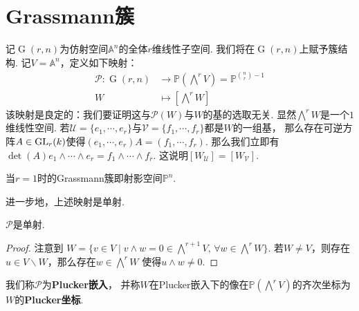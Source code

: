 \section{Grassmann簇}
    记$\operatorname{G}(r,n)$为仿射空间$\mathbb{A}^{n}$的全体$r$维线性子空间. 
    我们将在$\operatorname{G}(r,n)$上赋予簇结构. 
    记$V = \mathbb{A}^{n}$，定义如下映射：
    \begin{equation*}\begin{aligned}
      \mathcal{P}\colon\operatorname{G}(r,n) 
      &\longrightarrow \mathbb{P}(\bigwedge\nolimits^{r}V)=\mathbb{P}^{{n \choose r}-1} \\
      W &\longmapsto [\bigwedge\nolimits^{r}W]
    \end{aligned}\end{equation*}
    该映射是良定的：我们要证明这与$\mathcal{P}(W)$与$W$的基的选取无关. 
    显然$\bigwedge\nolimits^{r}W$是一个$1$维线性空间.
    若$\mathcal{U}=\{e_{1},\cdots,e_{r}\}$与$\mathcal{V}=\{f_{1},\cdots,f_{r}\}$都是$W$的一组基，
    那么存在可逆方阵$A \in {\rm GL}_{r}(k)$使得$(e_{1},\cdots,e_{r})A=(f_{1},\cdots,f_{r})$.
    那么我们立即有
    $\det(A)e_{1}\wedge\cdots\wedge e_{r}=f_{1}\wedge\cdots\wedge f_{r}$. 
    这说明$[W_{\mathcal{U}}]=[W_{\mathcal{V}}]$.
    \begin{example}
        当$r=1$时的Grassmann簇即射影空间$\mathbb{P}^{n}$.
    \end{example}

    进一步地，上述映射是单射.

    \begin{proposition}[Plucker嵌入]
        $\mathcal{P}$是单射.
    \end{proposition}
    \begin{proof}
        注意到
        $W=\{v \in V \mid v \wedge w=0 \in \bigwedge\nolimits^{r+1}V,\, \forall w \in \bigwedge\nolimits^{r} W\}$. 
        若$W \neq V$，则存在$u \in V \backslash W$，那么存在$w \in \bigwedge\nolimits^{r} W$
        使得$u \wedge w \neq 0$. 
    \end{proof}
    我们称$\mathcal{P}$为\textbf{Plucker嵌入}，
    并称$W$在Plucker嵌入下的像在$\mathbb{P}(\bigwedge\nolimits^{r}V)$的齐次坐标为
    $W$的\textbf{Plucker坐标}.
    
